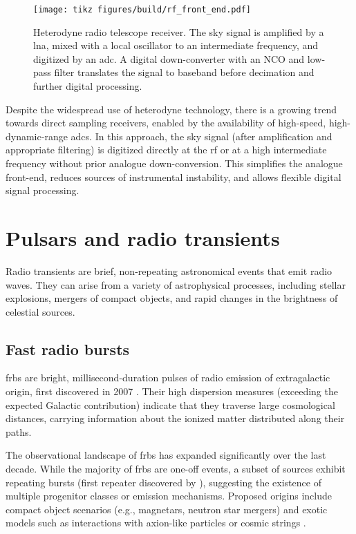 \begin{figure}[h!]
	\centering
	\texttt{[image: tikz figures/build/rf\_front\_end.pdf]}
	\caption[Heterodyne receiver]{Heterodyne radio telescope receiver. The sky signal is amplified by a \gls{lna}, mixed with a local oscillator to an intermediate frequency, and digitized by an \gls{adc}. A digital down-converter with an NCO and low-pass filter translates the signal to baseband before decimation and further digital processing.}
	\label{fig:heterodyne_receiver}
\end{figure}

Despite the widespread use of heterodyne technology, there is a growing trend towards direct sampling receivers, enabled by the availability of high-speed, high-dynamic-range \glspl{adc}. In this approach, the sky signal (after amplification and appropriate filtering) is digitized directly at the \gls{rf} or at a high intermediate frequency without prior analogue down-conversion. This simplifies the analogue front-end, reduces sources of instrumental instability, and allows flexible digital signal processing.

\section{Pulsars and radio transients}
\label{sec:transient_astronomy}
Radio transients are brief, non-repeating astronomical events that emit radio waves. They can arise from a variety of astrophysical processes, including stellar explosions, mergers of compact objects, and rapid changes in the brightness of celestial sources. 
\subsection{Fast radio bursts}

\Glspl{frb} are bright, millisecond-duration pulses of radio emission of extragalactic origin, first discovered in 2007 \citep{Lorimer_2007}. Their high dispersion measures (exceeding the expected Galactic contribution) indicate that they traverse large cosmological distances, carrying information about the ionized matter distributed along their paths.

The observational landscape of \Glspl{frb} has expanded significantly over the last decade. While the majority of \Glspl{frb} are one-off events, a subset of sources exhibit repeating bursts (first repeater discovered by \citet{Spitler_2016}), suggesting the existence of multiple progenitor classes or emission mechanisms. Proposed origins include compact object scenarios (e.g., magnetars, neutron star mergers) and exotic models such as interactions with axion-like particles or cosmic strings \citep{Zhang2023physics}.

